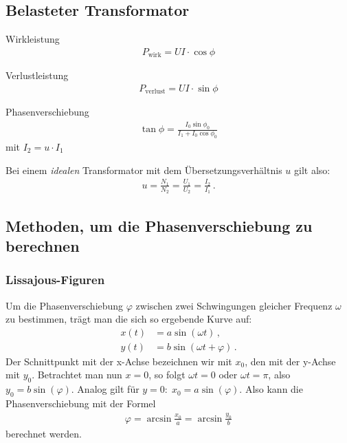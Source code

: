 \documentclass[12pt,a4paper,titlepage,headinclude,bibtotoc]{scrartcl}
\begin{document}
\subsection{Belasteter Transformator}
Wirkleistung
\begin{align}
	P_\text{wirk}=UI\cdot\cos\phi
\end{align}

Verlustleistung
\begin{align}
	P_\text{verlust}=UI\cdot\sin\phi
\end{align}

Phasenverschiebung
\begin{align}
	\tan\phi=\frac{I_0 \sin\phi_0}{I_1+I_0\cos\phi_0}
	\label{eq:phase_theo}
\end{align}
mit $I_2=u\cdot I_1$

Bei einem \textit{idealen} Transformator mit dem Übersetzungsverhältnis $u$ gilt also:
\begin{align}
	u=\frac{N_1}{N_2}=\frac{U_1}{U_2}=\frac{I_2}{I_1}\,.
	\label{eq:u}  
\end{align}

\subsection{Methoden, um die Phasenverschiebung zu berechnen}
\subsubsection{Lissajous-Figuren}
Um die Phasenverschiebung $\varphi$ zwischen zwei Schwingungen gleicher Frequenz $\omega$ zu bestimmen, trägt man die sich so ergebende Kurve auf:
\begin{align*}
	x(t)&=a\sin(\omega t)\,,\\
	y(t)&=b\sin(\omega t + \varphi) \,.
\end{align*}
Der Schnittpunkt mit der x-Achse bezeichnen wir mit $x_0$, den mit der y-Achse mit $y_0$.
Betrachtet man nun $x=0$, so folgt $\omega t=0$ oder $\omega t=\pi$, also $y_0=b \sin(\varphi)$.
Analog gilt für $y=0:\;x_0=a\sin(\varphi)$.
Also kann die Phasenverschiebung mit der Formel
\begin{align}
	\varphi=\arcsin\frac{x_0}{a}=\arcsin\frac{y_0}{b}
	\label{eq:lissajous}
\end{align}
berechnet werden.
\end{document}
